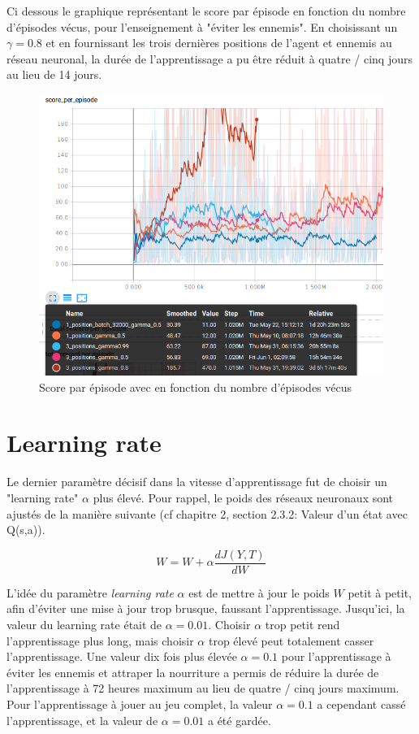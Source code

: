 \documentclass[11pt,a4paper]{report}
\begin{document}
   \newpage
   \par Ci dessous le graphique représentant le score par épisode en fonction du nombre d'épisodes vécus, pour l'enseignement à "éviter les ennemis". En choisissant un $\gamma = 0.8$ et en fournissant les trois dernières positions de l'agent et ennemis au réseau neuronal, la durée de l'apprentissage a pu être réduit à quatre / cinq jours au lieu de 14 jours. 
   
   \begin{figure}[!h]
   \center
   \includegraphics[scale=0.5]{ressources/input_size_gamma.png}
   \caption{Score par épisode avec en fonction du nombre d'épisodes vécus}
   \end{figure} 
   
   \newpage
   \section{Learning rate}
   
   \par Le dernier paramètre décisif dans la vitesse d'apprentissage fut de choisir un "learning rate" $\alpha$ plus élevé. Pour rappel, le poids des réseaux neuronaux sont ajustés de la manière suivante (cf chapitre 2, section 2.3.2: Valeur d’un état avec Q(s,a)). 
   
   $$W = W + \alpha \frac{dJ(Y,T)}{dW}$$
   
   \par L'idée du paramètre \textit{learning rate} $\alpha$ est de mettre à jour le poids $W$ petit à petit, afin d'éviter une mise à jour trop brusque, faussant l'apprentissage. Jusqu'ici, la valeur du learning rate était de $\alpha = 0.01$. Choisir $\alpha$ trop petit rend l'apprentissage plus long, mais choisir $\alpha$ trop élevé peut totalement casser l'apprentissage. Une valeur dix fois plus élevée $\alpha = 0.1$ pour l'apprentissage à éviter les ennemis et attraper la nourriture a permis de réduire la durée de l'apprentissage à 72 heures maximum au lieu de quatre / cinq jours maximum. Pour l'apprentissage à jouer au jeu complet, la valeur $\alpha = 0.1$ a cependant cassé l'apprentissage, et la valeur de $\alpha = 0.01$ a été gardée. 
   
\end{document}
